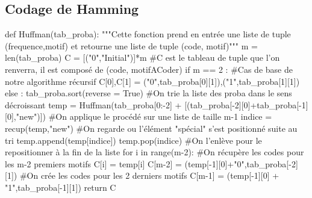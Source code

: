 \documentclass[a4paper,12pt,french]{article}
\begin{document}
	\subsection{Codage de Hamming}
	\begin{code}
	def Huffman(tab_proba):
    """Cette fonction prend en entrée une liste de tuple (frequence,motif)
    et retourne une liste de tuple (code, motif)"""
    m = len(tab_proba)
    C = [("0","Initial")]*m                                                                #C est le tableau de tuple que l'on renverra, il est composé de (code, motifACoder)
    if m == 2 :                                                                            #Cas de base de notre algorithme récursif
        C[0],C[1] = ("0",tab_proba[0][1]),("1",tab_proba[1][1])
    else :
        tab_proba.sort(reverse = True)                                                     #On trie la liste des proba dans le sens décroissant
        temp = Huffman(tab_proba[0:-2] + [(tab_proba[-2][0]+tab_proba[-1][0],"new")])      #On applique le procédé sur une liste de taille m-1
        indice = recup(temp,"new")                                                         
        #On regarde ou l'élément "spécial" s'est positionné suite au tri
        temp.append(temp[indice])
        temp.pop(indice)                                                                    #On l'enlève pour le repositionner à la fin de la liste
        for i in range(m-2):                                                                #On récupère les codes pour les m-2 premiers motifs
            C[i] = temp[i]
        C[m-2] = (temp[-1][0]+"0",tab_proba[-2][1])                                         #On crée les codes pour les 2 derniers motifs
        C[m-1] = (temp[-1][0] + "1",tab_proba[-1][1])
    return C
	\end{code}
\end{document}
